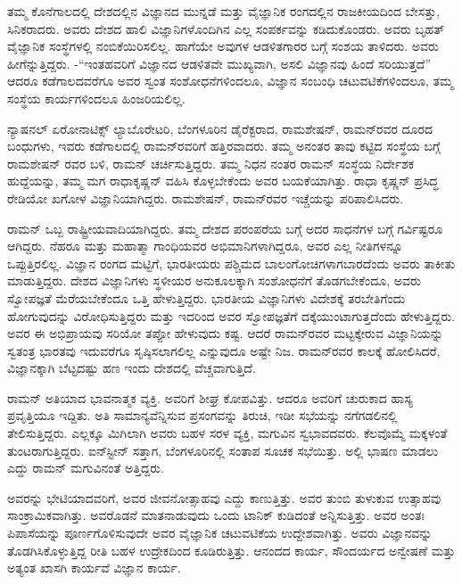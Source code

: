 ತಮ್ಮ ಕೊನೆಗಾಲದಲ್ಲಿ ದೇಶದಲ್ಲಿನ ವಿಜ್ಞಾನದ ಮುನ್ನಡೆ ಮತ್ತು ವೈಜ್ಞಾನಿಕ ರಂಗದಲ್ಲಿನ ರಾಜಕೀಯದಿಂದ ಬೇಸತ್ತು, ಸಿನಿಕರಾದರು. ಅವರು ದೇಶದ ಹಾಲಿ ವಿಜ್ಞಾನಿಗಳೊಂದಿಗಿನ ಎಲ್ಲ ಸಂಪರ್ಕವನ್ನು ಕಡಿದುಕೊಂಡರು. ಅವರು ಬೃಹತ್ ವೈಜ್ಞಾನಿಕ ಸಂಸ್ಥೆಗಳಲ್ಲಿ ನಂಬಿಕೆಯಿರಿಸಲಿಲ್ಲ. ಹಾಗೆಯೇ ಅವುಗಳ ಆಡಳಿತಗಾರರ ಬಗ್ಗೆ ಸಂಶಯ ತಾಳಿದರು. ಅವರು ಹೀಗೆನ್ನುತ್ತಿದ್ದರು. -“ಇಂತಹವರಿಗೆ ವಿಜ್ಞಾನದ ಆಡಳಿತವೇ ಮುಖ್ಯವಾಗಿ, ಅಸಲಿ ವಿಜ್ಞಾನವು ಹಿಂದೆ ಸರಿಯುತ್ತದೆ” ಆದರೂ ಕಡೆಗಾಲದವರೆಗೂ ಅವರ ಸ್ವಂತ ಸಂಶೋಧನೆಗಳಿಂದಲೂ, ವಿಜ್ಞಾನ ಸಂಬಂಧಿ ಚಟುವಟಿಕೆಗಳಿಂದಲೂ, ತಮ್ಮ ಸಂಸ್ಥೆಯ ಕಾರ್ಯಗಳಿಂದಲೂ ಹಿಂಜರಿಯಲಿಲ್ಲ.

ನ್ಯಾಷನಲ್ ಏರೋನಾಟಿಕ್ಸ್ ಲ್ಯಾಬೊರೇಟರಿ, ಬೆಂಗಳೂರಿನ ಡೈರೆಕ್ಟರಾದ, ರಾಮಶೇಷನ್, ರಾಮನ್‍ರವರ ದೂರದ ಬಂಧುಗಳು, ಇವರು ಕಡೆಗಾಲದಲ್ಲಿ ರಾಮನ್‍ರವರಿಗೆ ಹತ್ತಿರವಾದರು. ತಮ್ಮ ಅನಂತರ ತಾವು ಕಟ್ಟಿದ ಸಂಸ್ಥೆಯ ಬಗ್ಗೆ ರಾಮಶೇಷನ್ ರವರ ಬಳಿ, ರಾಮನ್ ಚರ್ಚಿಸುತ್ತಿದ್ದರು. ತಮ್ಮ ನಿಧನ ನಂತರ ರಾಮನ್ ಸಂಸ್ಥೆಯ ನಿರ್ದೇಶಕ ಹುದ್ದೆಯನ್ನು, ತಮ್ಮ ಮಗ ರಾಧಾಕೃಷ್ಣನ್ ವಹಿಸಿ ಕೊಳ್ಳಬೇಕೆಂದು ಅವರ ಬಯಕೆಯಾಗಿತ್ತು. ರಾಧಾ ಕೃಷ್ಣನ್ ಪ್ರಸಿದ್ಧ ರೇಡಿಯೋ ಖಗೋಳ ವಿಜ್ಞಾನಿಯಾಗಿದ್ದರು. ರಾಮಶೇಷನ್, ರಾಮನ್‍ರವರ ಇಚ್ಚೆಯನ್ನು ಪರಿಪಾಲಿಸಿದರು.

ರಾಮನ್ ಒಬ್ಬ ರಾಷ್ಟ್ರೀಯವಾದಿಯಾಗಿದ್ದರು. ತಮ್ಮ ದೇಶದ ಪರಂಪರೆಯ ಬಗ್ಗೆ ಅದರ ಸಾಧನೆಗಳ ಬಗ್ಗೆ ಗರ್ವಿಷ್ಟರೂ ಆಗಿದ್ದರು. ನೆಹರೂ ಮತ್ತು ಮಹಾತ್ಮಾ ಗಾಂಧಿಯವರ ಅಭಿಮಾನಿಗಳಾಗಿದ್ದರೂ, ಅವರ ಎಲ್ಲ ನೀತಿಗಳನ್ನೂ ಒಪ್ಪುತ್ತಿರಲಿಲ್ಲ. ವಿಜ್ಞಾನ ರಂಗದ ಮಟ್ಟಿಗೆ, ಭಾರತೀಯರು ಪಶ್ಚಿಮದ ಬಾಲಂಗೋಚಿಗಳಾಗಬಾರದೆಂದು ಅವರು ತಾಕೀತು ಮಾಡುತ್ತಿದ್ದರು. ದೇಶದ ವಿಜ್ಞಾನಿಗಳು ಸ್ಥಳೀಯರ ಅನುಕೂಲಕ್ಕಾಗಿ ಸಂಶೋಧನೆಗೆ ತೊಡಗಬೇಕೆಂದೂ, ಅವರು ಸ್ವೋಪಜ್ಞತೆ ಮೆರೆಯಬೇಕೆಂದೂ ಒತ್ತಿ ಹೇಳುತ್ತಿದ್ದರು. ಭಾರತೀಯ ವಿಜ್ಞಾನಿಗಳು ವಿದೇಶಕ್ಕೆ ತರಬೇತಿಗೆಂದು ಹೋಗುವುದನ್ನು ವಿರೋಧಿಸುತ್ತಿದ್ದರು ಮತ್ತು ಇದರಿಂದ ಅವರ ಸ್ವೋಪಜ್ಞತೆಗೆ ದಕ್ಕೆಯುಂಟಾಗುತ್ತದೆಂದು ಹೇಳುತ್ತಿದ್ದರು. ಅವರ ಈ ಅಭಿಪ್ರಾಯವು ಸರಿಯೋ ತಪ್ಪೋ ಹೇಳುವುದು ಕಷ್ಟ. ಆದರೆ ರಾಮನ್‍ರವರ ಮಟ್ಟಕ್ಕೇರುವ ವಿಜ್ಞಾನಿಯನ್ನು ಸ್ವತಂತ್ರ ಭಾರತವು ಇದುವರೆಗೂ ಸೃಷ್ಠಿಸಲಾಗಲಿಲ್ಲ ಎನ್ನುವುದೂ ಅಷ್ಟೇ ನಿಜ. ರಾಮನ್‍ರವರ ಕಾಲಕ್ಕೆ ಹೋಲಿಸಿದರೆ, ವಿಜ್ಞಾನಕ್ಕಾಗಿ ಬೆಟ್ಟದಷ್ಟು ಹಣ ಇಂದು ದೇಶದಲ್ಲಿ ವೆಚ್ಚವಾಗುತ್ತಿದೆ.

ರಾಮನ್ ಅತಿಯಾದ ಭಾವನಾತ್ಮಕ ವ್ಯಕ್ತಿ. ಅವರಿಗೆ ಶೀಘ್ರ ಕೋಪವಿತ್ತು. ಆದರೂ ಅವರಿಗೆ ಚುರುಕಾದ ಹಾಸ್ಯ ಪ್ರವೃತ್ತಿಯೂ ಇದ್ದಿತು. ಅತಿ ಸಾಮಾನ್ಯವೆನ್ನಿಸುವ ಪ್ರಸಂಗವನ್ನು ತಿರುಚಿ, ಇಡೀ ಸಭೆಯನ್ನು ನಗೆಗಡಲಿನಲ್ಲಿ ತೇಲಿಸುತ್ತಿದ್ದರು. ಎಲ್ಲಕ್ಕೂ ಮಿಗಿಲಾಗಿ ಅವರು ಬಹಳ ಸರಳ ವ್ಯಕ್ತಿ, ಮಗುವಿನ ಸ್ವಭಾವದವರು. ಕೆಲವೊಮ್ಮೆ ಮಕ್ಕಳಂತೆ ತುಂಟರಾಗುತ್ತಿದ್ದರು. ಐನ್‍ಸ್ಟೀನ್ ಸತ್ತಾಗ, ಬೆಂಗಳೂರಿನಲ್ಲಿ ಸಂತಾಪ ಸೂಚಕ ಸಭೆಯಿತ್ತು. ಅಲ್ಲಿ ಭಾಷಣ ಮಾಡಲು ಎದ್ದು ರಾಮನ್ ಮಗುವಿನಂತೆ ಅತ್ತಿದ್ದರು.

ಅವರನ್ನು ಭೇಟಿಯಾದವರಿಗೆ, ಅವರ ಜೀವನೋತ್ಸಾಹವು ಎದ್ದು ಕಾಣುತ್ತಿತ್ತು. ಅವರ ತುಂಬಿ ತುಳುಕುವ ಉತ್ಸಾಹವು ಸಾಂಕ್ರಾಮಿಕವಾಗಿತ್ತು. ಅವರೊಡನೆ ಮಾತನಾಡುವುದು ಒಂದು ಟಾನಿಕ್ ಕುಡಿದಂತೆ ಅನ್ನಿಸುತ್ತಿತ್ತು. ಅವರ ಅಂತಃ ಪಿಪಾಸೆಯನ್ನು ಪೂರ್ಣಗೊಳಿಸುವುದೇ ಅವರ ವೈಜ್ಞಾನಿಕ ಚಟುವಟಿಕೆಯ ಉದ್ದೇಶವಾಗಿತ್ತು. ಅವರು ವಿಜ್ಞಾನವನ್ನು ತೊಡಗಿಸಿಕೊಳ್ಳುತ್ತಿದ್ದ ರೀತಿ ಬಹಳ ಉದ್ರೇಕದಿಂದ ಕೂಡಿರುತ್ತಿತ್ತು. ಆನಂದದ ಕಾರ್ಯ, ಸೌಂದರ್ಯದ ಅನ್ವೇಷಣೆ ಮತ್ತು ಅತ್ಯಂತ ಖಾಸಗಿ ಕಾರ್ಯವೆ ವಿಜ್ಞಾನ ಕಾರ್ಯ.

